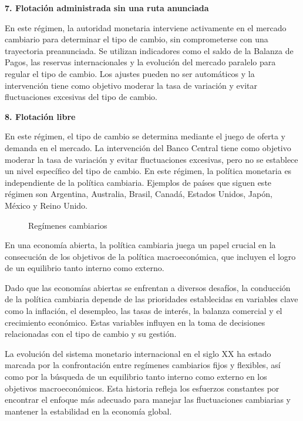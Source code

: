 \documentclass[
  jou,
  floatsintext,
  longtable,
  a4paper,
  nolmodern,
  notxfonts,
  notimes,
  12pt,
  colorlinks=true,linkcolor=blue,citecolor=blue,urlcolor=blue]{apa7}
\begin{document}
\textbf{7. Flotación administrada sin una ruta anunciada}

En este régimen, la autoridad monetaria interviene activamente en el
mercado cambiario para determinar el tipo de cambio, sin comprometerse
con una trayectoria preanunciada. Se utilizan indicadores como el saldo
de la Balanza de Pagos, las reservas internacionales y la evolución del
mercado paralelo para regular el tipo de cambio. Los ajustes pueden no
ser automáticos y la intervención tiene como objetivo moderar la tasa de
variación y evitar fluctuaciones excesivas del tipo de cambio.

\textbf{8. Flotación libre}

En este régimen, el tipo de cambio se determina mediante el juego de
oferta y demanda en el mercado. La intervención del Banco Central tiene
como objetivo moderar la tasa de variación y evitar fluctuaciones
excesivas, pero no se establece un nivel específico del tipo de cambio.
En este régimen, la política monetaria es independiente de la política
cambiaria. Ejemplos de países que siguen este régimen son Argentina,
Australia, Brasil, Canadá, Estados Unidos, Japón, México y Reino Unido.

\begin{figure}

\caption{\label{fig-1}Regímenes cambiarios}

\centering{

}

\end{figure}%

En una economía abierta, la política cambiaria juega un papel crucial en
la consecución de los objetivos de la política macroeconómica, que
incluyen el logro de un equilibrio tanto interno como externo.

Dado que las economías abiertas se enfrentan a diversos desafíos, la
conducción de la política cambiaria depende de las prioridades
establecidas en variables clave como la inflación, el desempleo, las
tasas de interés, la balanza comercial y el crecimiento económico. Estas
variables influyen en la toma de decisiones relacionadas con el tipo de
cambio y su gestión.

La evolución del sistema monetario internacional en el siglo XX ha
estado marcada por la confrontación entre regímenes cambiarios fijos y
flexibles, así como por la búsqueda de un equilibrio tanto interno como
externo en los objetivos macroeconómicos. Esta historia refleja los
esfuerzos constantes por encontrar el enfoque más adecuado para manejar
las fluctuaciones cambiarias y mantener la estabilidad en la economía
global.
\end{document}
